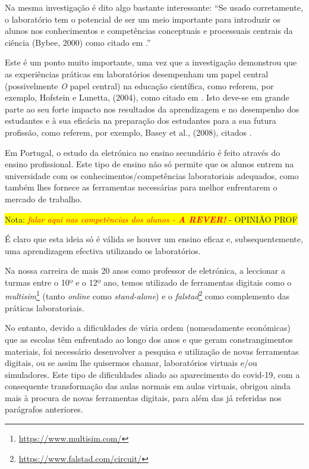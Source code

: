 Na mesma investigação é dito algo bastante interessante: ``Se usado corretamente, o laboratório tem o potencial de ser um meio importante para introduzir os alunos nos conhecimentos e competências conceptuais e processuais centrais da ciência (Bybee, 2000) como citado em \cite{Hofstein}.''

Este é um ponto muito importante, uma vez que a investigação demonstrou que as experiências práticas em laboratórios desempenham um papel central (possivelmente \textit{O} papel central) na educação científica, como referem, por exemplo, Hofstein e Lunetta, (2004), como citado em \cite{BRINSON2015218}. Isto deve-se em grande parte ao seu forte impacto nos resultados da aprendizagem e no desempenho dos estudantes e à sua eficácia na preparação dos estudantes para a sua futura profissão, como referem, por exemplo, Basey et al., (2008), citados \cite{BRINSON2015218}.

Em Portugal, o estudo da eletrónica no ensino secundário é feito através do ensino profissional. Este tipo de ensino não só permite que os alunos entrem na universidade com os conhecimentos/competências laboratoriais adequados, como também lhes fornece as ferramentas necessárias para melhor enfrentarem o mercado de trabalho\cite{anqep}.

\colorbox{yellow}{Nota: \textit{\textcolor{red}{falar aqui nas competências dos alunos - \textbf{ A REVER!}}} - OPINIÃO PROF}

É claro que esta ideia só é válida se houver um ensino eficaz e, subsequentemente, uma aprendizagem efectiva utilizando os laboratórios.

Na nossa carreira de mais 20 anos como professor de eletrónica, a leccionar a turmas entre o 10º e o 12º ano, temos utilizado de ferramentas digitais como o \textit{multisim}\footnote{\url{https://www.multisim.com/}} (tanto \textit{online} como \textit{stand-alone}) e o \textit{falstad}\footnote{\url{https://www.falstad.com/circuit/}} como complemento das práticas laboratoriais.

No entanto, devido a dificuldades de vária ordem (nomeadamente económicas) que as escolas têm enfrentado ao longo dos anos e que geram constrangimentos materiais, foi necessário desenvolver a pesquisa e utilização de novas ferramentas digitais, ou se assim lhe quisermos chamar, laboratórios virtuais e/ou simuladores.
Este tipo de dificuldades aliado ao aparecimento do \acrshort{covid-19}, com a consequente transformação das aulas normais em aulas virtuais, obrigou ainda mais à procura de novas ferramentas digitais, para além das já referidas nos parágrafos anteriores.

